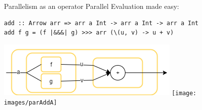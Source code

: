 \begin{frame}[fragile]{Parallelism as an operator}
Parallel Evaluation made easy:
\begin{lstlisting}[frame=htrbl]
add :: Arrow arr => arr a Int -> arr a Int -> arr a Int
add f g = (f |&&&| g) >>> arr (\(u, v) -> u + v)
\end{lstlisting}
\begin{center}
	\includegraphics[scale=0.6]{images/addA-comb}
	\hspace{2em}
	\texttt{[image: images/parAddA]}
\end{center}
\end{frame}